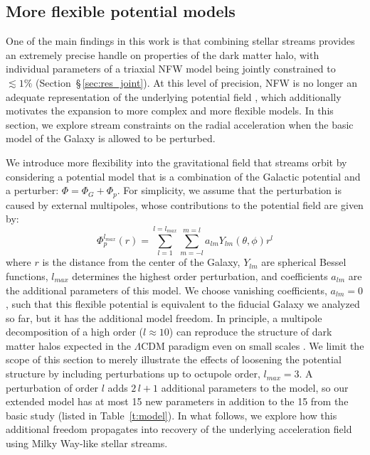 \documentclass[modern]{aastex61}
\begin{document}
\subsection{More flexible potential models}
\label{sec:bfe}
One of the main findings in this work is that combining stellar streams provides an extremely precise handle on properties of the dark matter halo, with individual parameters of a triaxial NFW model being jointly constrained to $\lesssim1\%$ (Section~\S\,\ref{sec:res_joint}).
At this level of precision, NFW is no longer an adequate representation of the underlying potential field \citep[e.g.,][]{bonaca2014}, which additionally motivates the expansion to more complex and more flexible models.
In this section, we explore stream constraints on the radial acceleration when the basic model of the Galaxy is allowed to be perturbed.

We introduce more flexibility into the gravitational field that streams orbit by considering a potential model that is a combination of the Galactic potential and a perturber: $\Phi = \Phi_{G} + \Phi_{p}$. 
For simplicity, we assume that the perturbation is caused by external multipoles, whose contributions to the potential field are given by:
\begin{equation}
\Phi_{p}^{l_{max}}(r) = \sum_{l=1}^{l=l_{max}}\sum_{m=-l}^{m=l} a_{lm} Y_{lm}(\theta,\phi) r^l
\label{eq:multipoles}
\end{equation}
where $r$ is the distance from the center of the Galaxy, $Y_{lm}$ are spherical Bessel functions, $l_{max}$ determines the highest order perturbation, and coefficients $a_{lm}$ are the additional parameters of this model.
We choose vanishing coefficients, $a_{lm}=0$, such that this flexible potential is equivalent to the fiducial Galaxy we analyzed so far, but it has the additional model freedom.
In principle, a multipole decomposition of a high order ($l\approx 10$) can reproduce the structure of dark matter halos expected in the $\Lambda$CDM paradigm even on small scales \citep{lowing2011}.
We limit the scope of this section to merely illustrate the effects of loosening the potential structure by including perturbations up to octupole order, $l_{max}=3$.
A perturbation of order $l$ adds $2\,l+1$ additional parameters to the model, so our extended model has at most 15 new parameters in addition to the 15 from the basic study (listed in Table~\ref{t:model}).
In what follows, we explore how this additional freedom propagates into recovery of the underlying acceleration field using Milky Way-like stellar streams.
\end{document}
